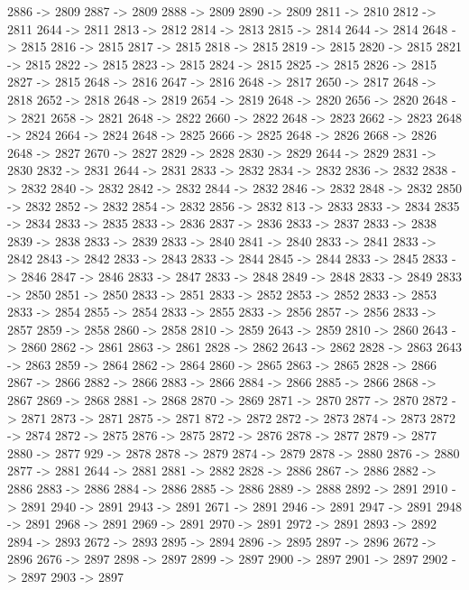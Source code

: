 {	2886 -> 2809
	2887 -> 2809
	2888 -> 2809
	2890 -> 2809
	2811 -> 2810
	2812 -> 2811
	2644 -> 2811
	2813 -> 2812
	2814 -> 2813
	2815 -> 2814
	2644 -> 2814
	2648 -> 2815
	2816 -> 2815
	2817 -> 2815
	2818 -> 2815
	2819 -> 2815
	2820 -> 2815
	2821 -> 2815
	2822 -> 2815
	2823 -> 2815
	2824 -> 2815
	2825 -> 2815
	2826 -> 2815
	2827 -> 2815
	2648 -> 2816
	2647 -> 2816
	2648 -> 2817
	2650 -> 2817
	2648 -> 2818
	2652 -> 2818
	2648 -> 2819
	2654 -> 2819
	2648 -> 2820
	2656 -> 2820
	2648 -> 2821
	2658 -> 2821
	2648 -> 2822
	2660 -> 2822
	2648 -> 2823
	2662 -> 2823
	2648 -> 2824
	2664 -> 2824
	2648 -> 2825
	2666 -> 2825
	2648 -> 2826
	2668 -> 2826
	2648 -> 2827
	2670 -> 2827
	2829 -> 2828
	2830 -> 2829
	2644 -> 2829
	2831 -> 2830
	2832 -> 2831
	2644 -> 2831
	2833 -> 2832
	2834 -> 2832
	2836 -> 2832
	2838 -> 2832
	2840 -> 2832
	2842 -> 2832
	2844 -> 2832
	2846 -> 2832
	2848 -> 2832
	2850 -> 2832
	2852 -> 2832
	2854 -> 2832
	2856 -> 2832
	813 -> 2833
	2833 -> 2834
	2835 -> 2834
	2833 -> 2835
	2833 -> 2836
	2837 -> 2836
	2833 -> 2837
	2833 -> 2838
	2839 -> 2838
	2833 -> 2839
	2833 -> 2840
	2841 -> 2840
	2833 -> 2841
	2833 -> 2842
	2843 -> 2842
	2833 -> 2843
	2833 -> 2844
	2845 -> 2844
	2833 -> 2845
	2833 -> 2846
	2847 -> 2846
	2833 -> 2847
	2833 -> 2848
	2849 -> 2848
	2833 -> 2849
	2833 -> 2850
	2851 -> 2850
	2833 -> 2851
	2833 -> 2852
	2853 -> 2852
	2833 -> 2853
	2833 -> 2854
	2855 -> 2854
	2833 -> 2855
	2833 -> 2856
	2857 -> 2856
	2833 -> 2857
	2859 -> 2858
	2860 -> 2858
	2810 -> 2859
	2643 -> 2859
	2810 -> 2860
	2643 -> 2860
	2862 -> 2861
	2863 -> 2861
	2828 -> 2862
	2643 -> 2862
	2828 -> 2863
	2643 -> 2863
	2859 -> 2864
	2862 -> 2864
	2860 -> 2865
	2863 -> 2865
	2828 -> 2866
	2867 -> 2866
	2882 -> 2866
	2883 -> 2866
	2884 -> 2866
	2885 -> 2866
	2868 -> 2867
	2869 -> 2868
	2881 -> 2868
	2870 -> 2869
	2871 -> 2870
	2877 -> 2870
	2872 -> 2871
	2873 -> 2871
	2875 -> 2871
	872 -> 2872
	2872 -> 2873
	2874 -> 2873
	2872 -> 2874
	2872 -> 2875
	2876 -> 2875
	2872 -> 2876
	2878 -> 2877
	2879 -> 2877
	2880 -> 2877
	929 -> 2878
	2878 -> 2879
	2874 -> 2879
	2878 -> 2880
	2876 -> 2880
	2877 -> 2881
	2644 -> 2881
	2881 -> 2882
	2828 -> 2886
	2867 -> 2886
	2882 -> 2886
	2883 -> 2886
	2884 -> 2886
	2885 -> 2886
	2889 -> 2888
	2892 -> 2891
	2910 -> 2891
	2940 -> 2891
	2943 -> 2891
	2671 -> 2891
	2946 -> 2891
	2947 -> 2891
	2948 -> 2891
	2968 -> 2891
	2969 -> 2891
	2970 -> 2891
	2972 -> 2891
	2893 -> 2892
	2894 -> 2893
	2672 -> 2893
	2895 -> 2894
	2896 -> 2895
	2897 -> 2896
	2672 -> 2896
	2676 -> 2897
	2898 -> 2897
	2899 -> 2897
	2900 -> 2897
	2901 -> 2897
	2902 -> 2897
	2903 -> 2897
}
